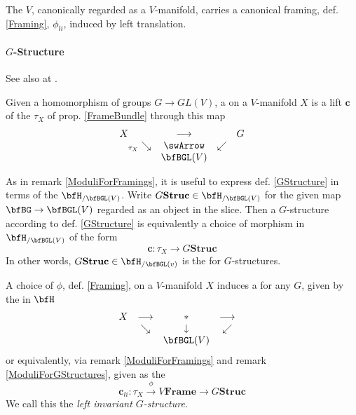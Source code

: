 \begin{prop}
\label{LeftTranslationFraming}\hypertarget{LeftTranslationFraming}{}
The  $V$, canonically regarded as a $V$-manifold, carries a canonical framing, def. \ref{Framing}, $\phi_{li}$, induced by left translation.
\end{prop}
\hypertarget{GStructure}{}\paragraph*{{$G$-Structure}}\label{GStructure}
See also at .
\begin{defn}
\label{GStructure}\hypertarget{GStructure}{}
Given a homomorphism of groups $G \longrightarrow GL(V)$, a  on a $V$-manifold $X$ is a lift $\mathbf{c}$ of the  $\tau_X$ of prop. \ref{FrameBundle} through this map
\begin{displaymath}
\itexarray{
X && \stackrel{}{\longrightarrow} && G
\\
& {}_{\mathllap{\tau_X}}\searrow &\swArrow& \swarrow
\\
&& \bfBGL(V)
}
\end{displaymath}
\end{defn}
\begin{remark}
\label{ModuliForGStructures}\hypertarget{ModuliForGStructures}{}
As in remark \ref{ModuliForFramings}, it is useful to express def. \ref{GStructure} in terms of the  $\bfH_{/\bfBGL(V)}$. Write $G\mathbf{Struc}\in \bfH_{/\bfBGL(V)}$ for the given map $\bfBG\to \bfBGL(V)$ regarded as an object in the slice. Then a $G$-structure according to def. \ref{GStructure} is equivalently a choice of morphism in $\bfH_{/\bfBGL(V)}$ of the form
\begin{displaymath}
\mathbf{c} \colon \tau_X \longrightarrow G\mathbf{Struc}
\end{displaymath}
In other words, $G\mathbf{Struc} \in \bfH_{/\bfBGL(v)}$ is the  for $G$-structures.
\end{remark}
\begin{example}
\label{GStructureFromLeftTranslationFraming}\hypertarget{GStructureFromLeftTranslationFraming}{}
A choice of  $\phi$, def. \ref{Framing}, on a $V$-manifold $X$ induces a  for any $G$, given by the  in $\bfH$
\begin{displaymath}
\itexarray{
X &\longrightarrow& \ast &\longrightarrow&
\\
& \searrow & \downarrow & \swarrow
\\
&& \bfBGL(V)
}
\end{displaymath}
or equivalently, via remark \ref{ModuliForFramings} and remark \ref{ModuliForGStructures}, given as the 
\begin{displaymath}
\mathbf{c}_{li}
\colon
\tau_X \stackrel{\phi}{\longrightarrow} V\mathbf{Frame} \longrightarrow G\mathbf{Struc}\end{displaymath}
We call this the \emph{left invariant $G$-structure}.
\end{example}
